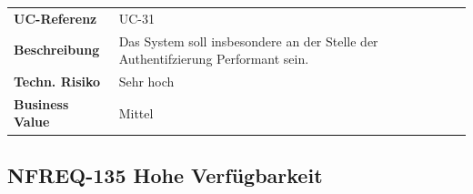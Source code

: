 \begin{longtable}[c]{@{}ll@{}}
\toprule
\begin{minipage}[t]{0.20\columnwidth}\raggedright\strut
\textbf{UC-Referenz}
\strut\end{minipage} &
\begin{minipage}[t]{0.74\columnwidth}\raggedright\strut
UC-31
\strut\end{minipage}\tabularnewline
\begin{minipage}[t]{0.20\columnwidth}\raggedright\strut
\textbf{Beschreibung}
\strut\end{minipage} &
\begin{minipage}[t]{0.74\columnwidth}\raggedright\strut
Das System soll insbesondere an der Stelle der Authentifzierung
Performant sein.
\strut\end{minipage}\tabularnewline
\begin{minipage}[t]{0.20\columnwidth}\raggedright\strut
\textbf{Techn. Risiko}
\strut\end{minipage} &
\begin{minipage}[t]{0.74\columnwidth}\raggedright\strut
Sehr hoch
\strut\end{minipage}\tabularnewline
\begin{minipage}[t]{0.20\columnwidth}\raggedright\strut
\textbf{Business Value}
\strut\end{minipage} &
\begin{minipage}[t]{0.74\columnwidth}\raggedright\strut
Mittel
\strut\end{minipage}\tabularnewline
\bottomrule
\end{longtable}

\subsection{NFREQ-135 Hohe
Verfügbarkeit}\label{nfreq-135-hohe-verfuxfcgbarkeit}

